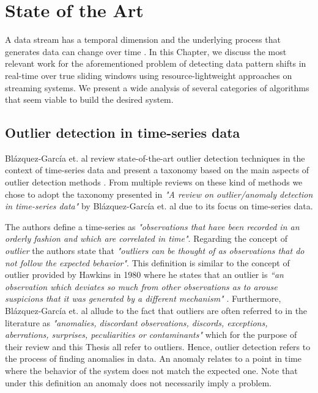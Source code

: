 \chapter{State of the Art} \label{chap:sota} \minitoc

A data stream has a temporal dimension and the underlying process that generates data can change over time \cite{Aggarwal-Evolving-Data-Streams} \cite{Domingos-Mining-Time-Data-Streams}. In this Chapter, we discuss the most relevant work for the aforementioned problem of detecting data pattern shifts in real-time over true sliding windows using resource-lightweight approaches on streaming systems. We present a wide analysis of several categories of algorithms that seem viable to build the desired system. 


\section{Outlier detection in time-series data}
Blázquez-García et. al review state-of-the-art outlier detection techniques in the context of time-series data and present a taxonomy based on the main aspects of outlier detection methods \cite{Blazquez-Garcia-Review-Anomaly-Detection}. From multiple reviews on these kind of methods \cite{Aggarwal-Outlier-survey} \cite{Aguinis-Outlier-survey} \cite{Chandola-Outlier-survey-2009} \cite{Hodge-Outlier-survey} \cite{Xu-outlier-survey-2019} we chose to adopt the taxonomy presented in \textit{"A review on outlier/anomaly detection in time-series data"} by Blázquez-García et. al due to its focus on time-series data.

The authors define a time-series as \textit{"observations that have been recorded in an orderly fashion and which are correlated in time"}. Regarding the concept of \textit{outlier} the authors state that \textit{"outliers can be thought of as observations that do not follow the expected behavior"}. This definition is similar to the concept of outlier provided by Hawkins in 1980 where he states that an outlier is \textit{“an observation which deviates so much from other observations as to arouse suspicions that it was
generated by a different mechanism"} \cite{Hawkins-Outliers}. Furthermore, Blázquez-García et. al allude to the fact that outliers are often referred to in the literature as \textit{"anomalies, discordant observations, discords, exceptions, aberrations, surprises, peculiarities or contaminants"} which for the purpose of their review and this Thesis all refer to outliers. Hence, outlier detection refers to the process of finding anomalies in data. An anomaly relates to a point in time where the behavior of the system does not match the expected one. Note that under this definition an anomaly does not necessarily imply a problem. 

